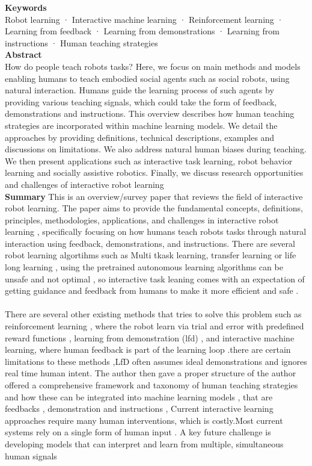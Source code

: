 \documentclass[report.tex]{subfiles}
\begin{document}
\noindent\textbf{Keywords} \\
Robot learning · Interactive machine learning ·  Reinforcement learning · Learning from feedback · Learning from  demonstrations · Learning from instructions · Human teaching strategies
   \\

\noindent\textbf{Abstract} \\
How do people teach robots tasks? Here, we focus on main methods and models enabling humans to teach embodied social agents such as social robots, using natural interaction. Humans guide the learning process of such agents by providing various teaching signals, which could take the form of feedback, demonstrations and instructions. This overview describes how human teaching strategies are incorporated within machine learning models. We detail the approaches by providing definitions, technical descriptions, examples and discussions on limitations. We also address natural human biases during teaching. We then present applications such as interactive task learning, robot behavior learning and socially assistive robotics. Finally, we discuss research opportunities and challenges of interactive robot learning \\


\noindent\textbf{Summary} 
This is an overview/survey paper that reviews the field of interactive robot learning. The paper aims to provide the fundamental concepts, definitions, principles, methodologies, applications, and challenges in interactive robot learning , specifically focusing on how humans teach robots tasks through natural interaction using feedback, demonstrations, and instructions. There are several robot learning algortihms such as Multi tkask learning, transfer learning or life long learning , using the pretrained autonomous learning algorithms can be unsafe and not optimal , so interactive task leaning  comes with an expectation of getting guidance and feedback from humans to make it more efficient and safe . \\\\ There are several other existing  methods that tries to solve this problem such as reinforcement learning , where the robot learn via trial and error with predefined reward functions , learning from demonstration (lfd) , and interactive machine learning, where human feedback is part of the learning loop .there are certain limitations to these methods ,LfD often assumes ideal demonstrations and ignores real time human intent. The author then gave a proper structure of the author offered a comprehensive framework and taxonomy of human teaching strategies and how these can be integrated into machine learning models , that are feedbacks , demonstration and instructions , Current interactive learning approaches require many human interventions, which is costly.Most current systems rely on a single form of human input . A key future challenge is developing models that can interpret and learn from multiple, simultaneous human signals
\end{document}
